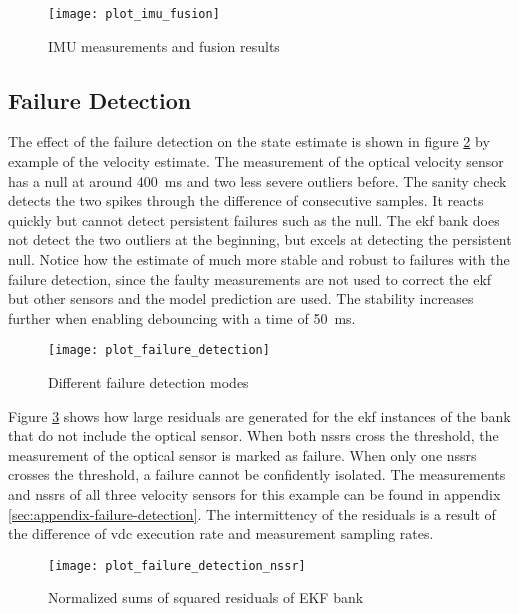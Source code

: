 \begin{figure}[t]
	\centering
	\texttt{[image: plot\_imu\_fusion]}%
	\caption{IMU measurements and fusion results}
	\label{fig:imu-fusion}
\end{figure}


\subsection{Failure Detection}
The effect of the failure detection on the state estimate is shown in figure \ref{fig:failure-detection} by example of the velocity estimate. The measurement of the optical velocity sensor has a null at around \SI{400}{\milli\second} and two less severe outliers before. The sanity check detects the two spikes through the difference of consecutive samples. It reacts quickly but cannot detect persistent failures such as the null. The \gls{ekf} bank does not detect the two outliers at the beginning, but excels at detecting the persistent null. Notice how the estimate of much more stable and robust to failures with the failure detection, since the faulty measurements are not used to correct the \gls{ekf} but other sensors and the model prediction are used. The stability increases further when enabling debouncing with a time of \SI{50}{\milli\second}.

\begin{figure}[t]
	\centering
	\texttt{[image: plot\_failure\_detection]}%
	\caption{Different failure detection modes}
	\label{fig:failure-detection}
\end{figure}

Figure \ref{fig:failure-detection-nssr} shows how large residuals are generated for the \gls{ekf} instances of the bank that do not include the optical sensor. When both \glspl{nssr} cross the threshold, the measurement of the optical sensor is marked as failure. When only one \glspl{nssr} crosses the threshold, a failure cannot be confidently isolated. The measurements and \glspl{nssr} of all three velocity sensors for this example can be found in appendix \ref{sec:appendix-failure-detection}. The intermittency of the residuals is a result of the difference of \gls{vdc} execution rate and measurement sampling rates.

\begin{figure}[t]
	\centering
	\texttt{[image: plot\_failure\_detection\_nssr]}%
	\caption{Normalized sums of squared residuals of EKF bank}
	\label{fig:failure-detection-nssr}
\end{figure}

